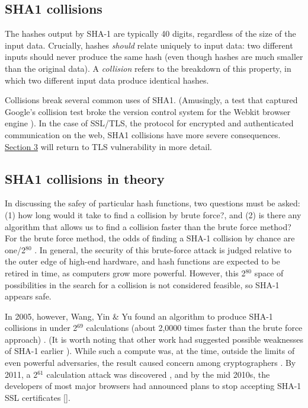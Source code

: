 \documentclass[sigconf]{acmart}
\begin{document}
\subsection{SHA1 collisions}
\label{sec:orgf773e81}

The hashes output by SHA-1 are typically 40 digits, regardless of the size of the input data.
Crucially, hashes \emph{should} relate uniquely to input data: 
two different inputs should never produce the same hash (even though hashes are much smaller than the original data).
A \emph{collision} refers to the breakdown of this property,
in which two different input data produce identical hashes.

Collisions break several common uses of SHA1. 
(Amusingly, a test that captured Google's collision test broke the version control system for the Webkit browser engine \cite{Koivisto2017}).
In the case of SSL/TLS, the protocol for encrypted and authenticated communication on the web, SHA1 collisions have more severe consequences.
\uline{Section 3} will return to TLS vulnerability in more detail.

\subsection{SHA1 collisions in theory}
\label{sec:org6078dbc}

In discussing the safey of particular hash functions, two questions must be asked:
(1) how long would it take to find a collision by brute force?, and 
(2) is there any algorithm that allows us to find a collision faster than the brute force method?
For the brute force method, the odds of finding a SHA-1 collision by chance are one/2\(^{\text{80}}\)
\cite{Schneier2005}.
In general, the security of this brute-force attack is judged relative to the outer edge of high-end hardware, and hash functions are expected to be retired in time, as computers grow more powerful.
However, this 2\(^{\text{80}}\) space of possibilities in the search for a collision is not considered feasible, so SHA-1 appears safe.

In 2005, however, Wang, Yin \& Yu found an algorithm to produce SHA-1 collisions in under 2\(^{\text{69}}\) calculations (about 2,0000 times faster than the brute force approach)
\cite{Wang2005}.
(It is worth noting that other work had suggested possible weaknesses of SHA-1 earlier \cite{Biham2005}).
While such a compute was, at the time, outside the limits of even powerful adversaries,
the result caused concern among cryptographers \cite{Schneier2005}.
By 2011, a 2\(^{\text{61}}\) calculation attack was discovered \cite{Stevens2013a},
and by the mid 2010s, the developers of most major browsers had announced plans to stop accepting SHA-1 SSL certificates \uline{[]}.
\end{document}
